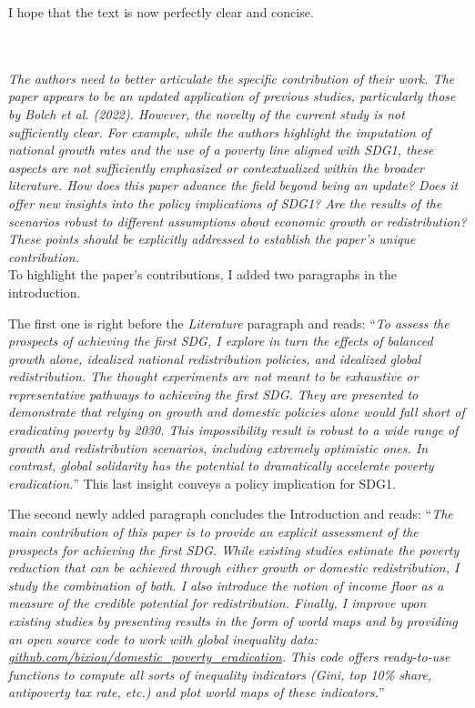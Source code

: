 \documentclass[12pt,english]{article}
\begin{document}
I hope that the text is now perfectly clear and concise.

~\\ ~\\

\textit{The authors need to better articulate the specific contribution of their work. The paper appears to be an updated application of previous studies, particularly those by Bolch et al. (2022). However, the novelty of the current study is not sufficiently clear. For example, while the authors highlight the imputation of national growth rates and the use of a poverty line aligned with SDG1, these aspects are not sufficiently emphasized or contextualized within the broader literature. How does this paper advance the field beyond being an update? Does it offer new insights into the policy implications of SDG1? Are the results of the scenarios robust to different assumptions about economic growth or redistribution? These points should be explicitly addressed to establish the paper's unique contribution. }~\\

To highlight the paper's contributions, I added two paragraphs in the introduction. 

The first one is right before the \textit{Literature} paragraph and reads: ``\textit{To assess the prospects of achieving the first SDG, I explore in turn the effects of balanced growth alone, idealized national redistribution policies, and idealized global redistribution. The thought experiments are not meant to be exhaustive or representative pathways to achieving the first SDG. They are presented to demonstrate that relying on growth and domestic policies alone would fall short of eradicating poverty by 2030. This impossibility result is robust to a wide range of growth and redistribution scenarios, including extremely optimistic ones. In contrast, global solidarity has the potential to dramatically accelerate poverty eradication.}'' This last insight conveys a policy implication for SDG1.

The second newly added paragraph concludes the Introduction and reads: ``\textit{The main contribution of this paper is to provide an explicit assessment of the prospects for achieving the first SDG. While existing studies estimate the poverty reduction that can be achieved through either growth or domestic redistribution, I study the combination of both. I also introduce the notion of \textit{income floor} as a measure of the credible potential for redistribution. Finally, I improve upon existing studies by presenting results in the form of world maps and by providing an open source code to work with global inequality data: \href{https://github.com/bixiou/domestic_poverty_eradication}{github.com/bixiou/domestic\_poverty\_eradication}. This code offers ready-to-use functions to compute all sorts of inequality indicators (Gini, top 10\% share, antipoverty tax rate, etc.) and plot world maps of these indicators.}''
\end{document}
